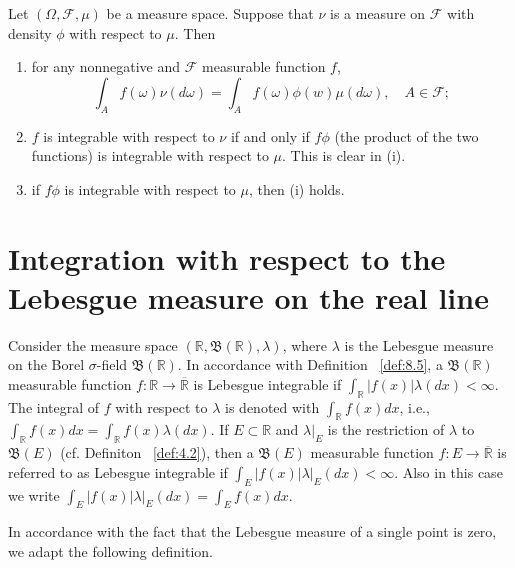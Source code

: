 \begin{proposition}[]
    \label{prop:9.3}
    Let $(\Omega, \mathcal{F}, \mu)$ be a measure space. Suppose that $\nu$ is a measure on
    $\mathcal{F}$ with density $\phi$ with respect to $\mu$. Then
    \begin{enumerate}[label=(\roman*)]
        \item for any nonnegative and $\mathcal{F}$ measurable function $f$,
            \[
            \int_{A} f(\omega)\nu(d\omega) = \int_{A} f(\omega)\phi(w)\mu(d\omega), \quad
            A \in \mathcal{F};
            \] 
        \item $f$ is integrable with respect to $\nu$ if and only if $f \phi$ (the product
            of the two functions) is integrable with respect to $\mu$. This is clear in (i).
        \item if $f \phi$ is integrable with respect to $\mu$, then (i) holds.
    \end{enumerate}
\end{proposition}

\section{Integration with respect to the Lebesgue measure on the real line}%
\label{sec:Integration with respect to the Lebesgue measure on the real line}

\begin{definition}[]
    \label{def:9.3}
    Consider the measure space $(\mathbb{R}, \mathfrak{B}(\mathbb{R}), \lambda)$, where $\lambda$
    is the Lebesgue measure on the Borel $\sigma$-field $\mathfrak{B}(\mathbb{R})$. In accordance
    with Definition ~\ref{def:8.5}, a $\mathfrak{B}(\mathbb{R})$ measurable function
    $f: \mathbb{R} \to \overline{\mathbb{R}}$ is Lebesgue integrable if
    $\int_{\mathbb{R}} |f(x)| \lambda(dx) < \infty$. The integral of $f$ with respect to $\lambda$
    is denoted with $\int_{\mathbb{R}}f(x)dx$, i.e., $\int_{\mathbb{R}} f(x)dx = 
    \int_{\mathbb{R}} f(x)\lambda(dx)$. If $E \subset \mathbb{R}$ and $\lambda|_E$ is the
    restriction of $\lambda$ to $\mathfrak{B}(E)$ (cf. Definiton ~\ref{def:4.2}), then a 
    $\mathfrak{B}(E)$ measurable function $f: E \to \overline{\mathbb{R}}$ is referred to as 
    Lebesgue integrable if $\int_{E} |f(x)| \lambda|_E (dx) < \infty$. Also in this case we write
    $\int_{E} |f(x)| \lambda|_E (dx) = \int_{E} f(x)dx$.
\end{definition}

In accordance with the fact that the Lebesgue measure of a single point is zero, we adapt the
following definition.

